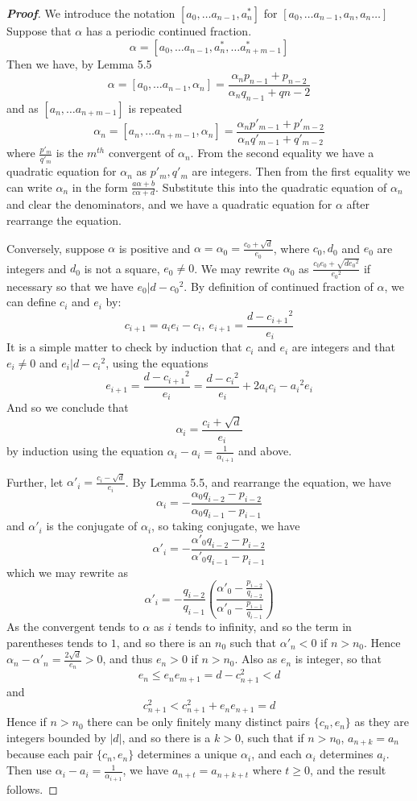 \begin{proof}[\bf Proof] We introduce the notation $[a_0,\ldots a_{n-1},a_n^*]$
for $[a_0,\ldots a_{n-1},a_n,a_n\ldots]$
Suppose that $\alpha$ has a periodic continued fraction.
$$\alpha=[a_0,\ldots a_{n-1},a_n^*,\ldots a_{n+m-1}^*]$$
Then we have, by Lemma 5.5
$$\alpha=[a_0,\ldots a_{n-1},\alpha_n]=\frac{\alpha_n p_{n-1}+p_{n-2}}{\alpha_n q_{n-1}+q{n-2}}$$
and as $[a_n,\ldots a_{n+m-1}]$ is repeated
$$\alpha_n=[a_n,\ldots a_{n+m-1},\alpha_n]=
\frac{\alpha_n p'_{m-1}+p'_{m-2}}{\alpha_n q'_{m-1}+q'_{m-2}}$$
where $\frac{p'_m}{q'_m}$ is the $m^{th}$ convergent of $\alpha_n$.
From the second equality we have a quadratic equation for $\alpha_n$ as $p'_m,q'_m$ are integers.
Then from the first equality we can write $\alpha_n$ in the form $\frac{a\alpha+b}{c\alpha+d}$.
Substitute this into the quadratic equation of $\alpha_n$ and clear the denominators, and we have a quadratic equation for $\alpha$ after rearrange the equation.

Conversely, suppose $\alpha$ is positive and $\alpha=\alpha_0=\frac{c_0+\sqrt{d}}{e_0}$, where
$c_0,d_0$ and $e_0$ are integers and $d_0$ is not a square, $e_0 \neq 0$. We may rewrite $\alpha_0$ as
$\frac{c_0e_0+\sqrt{d{e_0}^2}}{{e_0}^2}$ if necessary so that we have $e_0|d-{c_0}^2$.
By definition of continued fraction of $\alpha$, we can define $c_i$ and $e_i$ by:
$$c_{i+1}=a_i e_i- c_i,~e_{i+1}=\frac{d-{c_{i+1}}^2}{e_i}$$
It is a simple matter to check by induction that $c_i$ and $e_i$ are integers and that
$e_i \neq 0$ and $e_i|d-{c_i}^2$, using the equations
$$e_{i+1}=\frac{d-{c_{i+1}}^2}{e_i}=\frac{d-{c_i}^2}{e_i}+2a_ic_i-{a_i}^2e_i$$
And so we conclude that
$$\alpha_i=\frac{c_i+\sqrt{d}}{e_i}$$
by induction using the equation $\alpha_i-a_i=\frac{1}{\alpha_{i+1}}$ and above.

Further, let $\alpha'_i=\frac{c_i-\sqrt{d}}{e_i}$. By Lemma 5.5, and rearrange the equation, we have
$$\alpha_i=-\frac{\alpha_0 q_{i-2}-p_{i-2}}{\alpha_0 q_{i-1}-p_{i-1}}$$
and $\alpha'_i$ is the conjugate of $\alpha_i$, so taking conjugate, we have
$$\alpha'_i=-\frac{\alpha'_0 q_{i-2}-p_{i-2}}{\alpha'_0 q_{i-1} - p_{i-1}}$$
which we may rewrite as
$$\alpha'_i=-\frac{q_{i-2}}{q_{i-1}}\left(\frac{\alpha'_0 -\frac{p_{i-2}}{q_{i-2}}}
{\alpha'_0 -\frac{p_{i-1}}{q_{i-1}}}\right)$$
As the convergent tends to $\alpha$ as $i$ tends to infinity, and so the term in parentheses tends to $1$, and so there is an $n_0$ such that $\alpha'_n <0$ if $n > n_0$. Hence
$\alpha_n-\alpha'_n=\frac{2\sqrt{d}}{e_n}>0$, and thus $e_n >0$ if $n > n_0$. Also
as $e_n$ is integer, so that
$$e_n \le e_n e_{m+1}=d-c^2_{n+1}< d$$
and
$$c^2_{n+1} < c^2_{n+1} + e_n e_{n+1}=d$$
Hence if $n>n_0$ there can be only finitely many distinct pairs $\{c_n,e_n\}$ as they are integers bounded by $|d|$, and so there is a $k>0$, such that if $n>n_0$, $a_{n+k}=a_n$ because each pair $\{c_n,e_n\}$ determines a unique $\alpha_i$, and each $\alpha_i$ determines $a_i$. Then use
$\alpha_i-a_i=\frac{1}{\alpha_{i+1}}$, we have $a_{n+t}=a_{n+k+t}$ where $t \ge 0$, and the result follows.
\end{proof}
